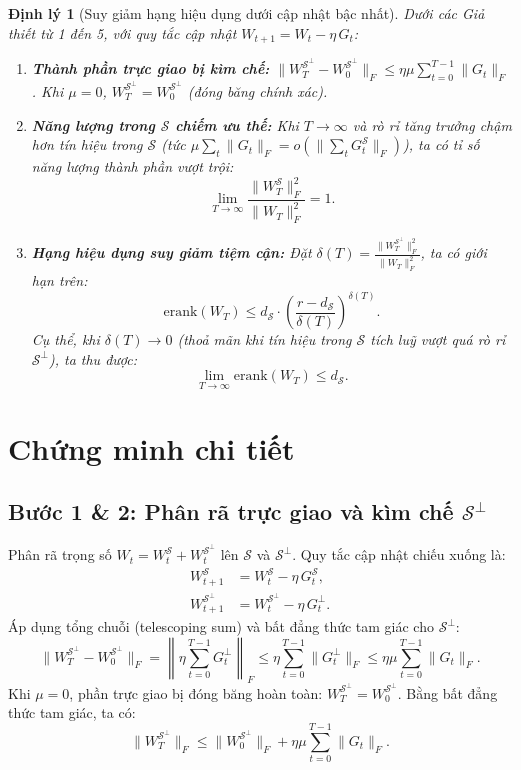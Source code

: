 \documentclass[11pt,a4paper]{article}
\newtheorem{theorem}{Định lý}
\newcommand{\erank}{\mathrm{erank}}
\newcommand{\cS}{\mathcal{S}}
\begin{document}
\begin{theorem}[Suy giảm hạng hiệu dụng dưới cập nhật bậc nhất]
\label{thm:rank_decay}
Dưới các Giả thiết từ 1 đến 5, với quy tắc cập nhật $W_{t+1} = W_t - \eta\, G_t$:
\begin{enumerate}[label=(\roman*)]
    \item \textbf{Thành phần trực giao bị kìm chế:} $\|W_T^{\cS^\perp} - W_0^{\cS^\perp}\|_F \leq \eta \mu \sum_{t=0}^{T-1} \|G_t\|_F$.  Khi $\mu = 0$, $W_T^{\cS^\perp} = W_0^{\cS^\perp}$ (đóng băng chính xác).
    
    \item \textbf{Năng lượng trong $\cS$ chiếm ưu thế:} Khi $T \to \infty$ và rò rỉ tăng trưởng chậm hơn tín hiệu trong $\cS$ (tức $\mu \sum_t \|G_t\|_F = o(\|\sum_t G_t^{\cS}\|_F)$), ta có tỉ số năng lượng thành phần vượt trội:
    \[
    \lim_{T \to \infty} \frac{\|W_T^{\cS}\|_F^2}{\|W_T\|_F^2} = 1.
    \]
    
    \item \textbf{Hạng hiệu dụng suy giảm tiệm cận:} Đặt $\delta(T) = \frac{\|W_T^{\cS^\perp}\|_F^2}{\|W_T\|_F^2}$, ta có giới hạn trên:
    \[
    \erank(W_T) \leq d_{\cS} \cdot \left(\frac{r - d_{\cS}}{\delta(T)}\right)^{\delta(T)}.
    \]
    Cụ thể, khi $\delta(T) \to 0$ (thoả mãn khi tín hiệu trong $\cS$ tích luỹ vượt quá rò rỉ $\cS^\perp$), ta thu được:
    \[
    \lim_{T \to \infty} \erank(W_T) \leq d_{\cS}.
    \]
\end{enumerate}
\end{theorem}

\section{Chứng minh chi tiết}

\subsection{Bước 1 \& 2: Phân rã trực giao và kìm chế $\cS^\perp$}

Phân rã trọng số $W_t = W_t^{\cS} + W_t^{\cS^\perp}$ lên $\cS$ và $\cS^\perp$. Quy tắc cập nhật chiếu xuống là:
\begin{align*}
W_{t+1}^{\cS} &= W_t^{\cS} - \eta\, G_t^{\cS}, \\
W_{t+1}^{\cS^\perp} &= W_t^{\cS^\perp} - \eta\, G_t^{\perp}. 
\end{align*}
Áp dụng tổng chuỗi (telescoping sum) và bất đẳng thức tam giác cho $\cS^\perp$:
\[
\|W_T^{\cS^\perp} - W_0^{\cS^\perp}\|_F = \left\| \eta \sum_{t=0}^{T-1} G_t^{\perp} \right\|_F \leq \eta \sum_{t=0}^{T-1} \|G_t^{\perp}\|_F \leq \eta \mu \sum_{t=0}^{T-1} \|G_t\|_F.
\]
Khi $\mu = 0$, phần trực giao bị đóng băng hoàn toàn: $W_T^{\cS^\perp} = W_0^{\cS^\perp}$. Bằng bất đẳng thức tam giác, ta có:
\[
\|W_T^{\cS^\perp}\|_F \le \|W_0^{\cS^\perp}\|_F + \eta \mu \sum_{t=0}^{T-1} \|G_t\|_F.
\]
\end{document}
